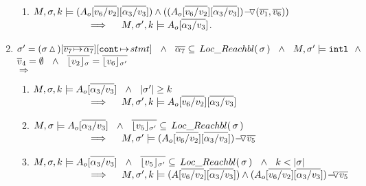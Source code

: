 \begin{lemma}
\begin{enumerate}
\begin{enumerate}
\item
\label{l:calls:callee:three}
$\satDAssertFrom M  \sigma k   {(\Ao[\overline {v_6/v_2}] [\overline {\alpha_3/v_3}])  \wedge ( {\PushASLong  {(\overline {v_1},\overline {v_6})} {(\Ao[\overline {v_6/v_2}] [\overline {\alpha_3/v_3}])}})}   $
 \\ 
$\strut \hspace{2cm}  \hfill \Longrightarrow  \ \ \  \   \satDAssertFrom M  {\sigma'} k  {\Ao[\overline { \alpha_3/v_3}]}$.

\end{enumerate}

\item
\label{l:calls:caller}
$\sigma'= (\sigma \popSymbol)[\overline{ v_7\! \mapsto\! \alpha_7}][\prg{cont}\!\mapsto\! stmt]
\ \ \wedge \ \  \overline {\alpha_7} \subseteq \LRelevantO \sigma  \ \ \wedge \ \  M, \sigma' \models \intThis
 \ \ \wedge $\\
 $\overline v_4 = \emptyset\ \ \wedge \ \  \overline {\interpret {\sigma}  {v_2} } = \overline {\interpret {\sigma'} {v_6} }$ 
\\ 
$\Longrightarrow$
 

\begin{enumerate}
\item
\label{l:calls:caller:one}
$\satDAssertFrom M  \sigma k   \Ao[\overline {\alpha_3/v_3}] \ \  \wedge\ \ \DepthSt {\sigma'} \geq k  \ 
$ \\ 
$\strut \hspace{2cm}  \hfill \Longrightarrow  \ \ \  \   \satDAssertFrom M  {\sigma'} k   {\Ao[\overline {v_6 / v_2}][\overline { \alpha_3/v_3}]}$ 

\item
\label{l:calls:caller:two}
$M, \sigma \models  {\Ao[\overline {\alpha_3/v_3}]}\ \ \wedge\ \  \overline {\interpret {\sigma'} {v_5}} \subseteq \LRelevantO \sigma
$ \\ 
$\strut \hspace{2cm}  \hfill \Longrightarrow  \ \ \  \  M , \sigma' \models  {\PushASLong  {\overline {v_5}}    {(\Ao[\overline {v_6 / v_2}][\overline { \alpha_3/v_3}])} }$


\item
\label{l:calls:caller:three}
$\satDAssertFrom M  \sigma k   {\Ao[\overline  {\alpha_3/v_3}]} \ \ \wedge\ \  %
\overline {\interpret {\sigma'} {v_5}} \subseteq \LRelevantO \sigma  \ \ \wedge \ \  k < \DepthSt \sigma$
\\  
$\strut \hspace{2cm}  \hfill \Longrightarrow  \ \ \  \   \satDAssertFrom M  {\sigma'} k    
{
{(A[\overline {v_6 / v_2}][\overline { \alpha_3/v_3}])} 
\wedge
{\PushASLong  {\overline {v_5}}    {(\Ao[\overline {v_6 / v_2}][\overline { \alpha_3/v_3}])} }
}
$
 \end{enumerate}
\end{enumerate}

\end{lemma}


